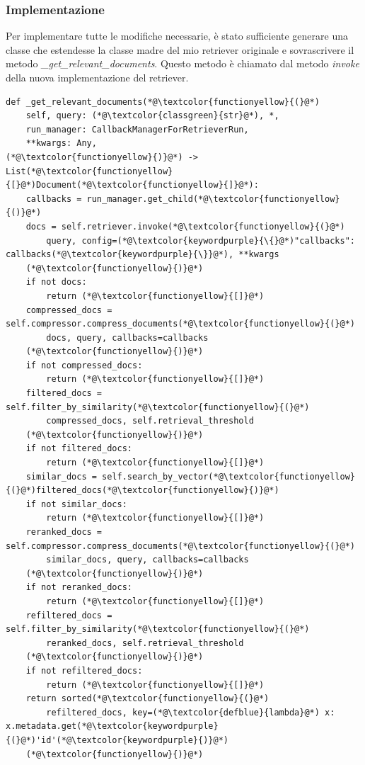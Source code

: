 \subsubsection{Implementazione}
Per implementare tutte le modifiche necessarie, è stato sufficiente generare una classe che estendesse la classe madre del mio retriever originale e sovrascrivere il metodo \textit{\_get\_relevant\_documents}. Questo metodo è chiamato dal metodo \textit{invoke} della nuova implementazione del retriever.
\begin{lstlisting}[label=lst:rerank, caption={Override del metodo di ricerca del retriever}]
def _get_relevant_documents(*@\textcolor{functionyellow}{(}@*)
    self, query: (*@\textcolor{classgreen}{str}@*), *,
    run_manager: CallbackManagerForRetrieverRun,
    **kwargs: Any,
(*@\textcolor{functionyellow}{)}@*) -> List(*@\textcolor{functionyellow}{[}@*)Document(*@\textcolor{functionyellow}{]}@*):
    callbacks = run_manager.get_child(*@\textcolor{functionyellow}{()}@*)
    docs = self.retriever.invoke(*@\textcolor{functionyellow}{(}@*)
        query, config=(*@\textcolor{keywordpurple}{\{}@*)"callbacks": callbacks(*@\textcolor{keywordpurple}{\}}@*), **kwargs
    (*@\textcolor{functionyellow}{)}@*)
    if not docs:
        return (*@\textcolor{functionyellow}{[]}@*)
    compressed_docs = self.compressor.compress_documents(*@\textcolor{functionyellow}{(}@*)
        docs, query, callbacks=callbacks
    (*@\textcolor{functionyellow}{)}@*)
    if not compressed_docs:
        return (*@\textcolor{functionyellow}{[]}@*)
    filtered_docs = self.filter_by_similarity(*@\textcolor{functionyellow}{(}@*)
        compressed_docs, self.retrieval_threshold
    (*@\textcolor{functionyellow}{)}@*)
    if not filtered_docs:
        return (*@\textcolor{functionyellow}{[]}@*)
    similar_docs = self.search_by_vector(*@\textcolor{functionyellow}{(}@*)filtered_docs(*@\textcolor{functionyellow}{)}@*)
    if not similar_docs:
        return (*@\textcolor{functionyellow}{[]}@*)
    reranked_docs = self.compressor.compress_documents(*@\textcolor{functionyellow}{(}@*)
        similar_docs, query, callbacks=callbacks
    (*@\textcolor{functionyellow}{)}@*)
    if not reranked_docs:
        return (*@\textcolor{functionyellow}{[]}@*)
    refiltered_docs = self.filter_by_similarity(*@\textcolor{functionyellow}{(}@*)
        reranked_docs, self.retrieval_threshold
    (*@\textcolor{functionyellow}{)}@*)
    if not refiltered_docs:
        return (*@\textcolor{functionyellow}{[]}@*)
    return sorted(*@\textcolor{functionyellow}{(}@*)
        refiltered_docs, key=(*@\textcolor{defblue}{lambda}@*) x: x.metadata.get(*@\textcolor{keywordpurple}{(}@*)'id'(*@\textcolor{keywordpurple}{)}@*)
    (*@\textcolor{functionyellow}{)}@*)
\end{lstlisting}
